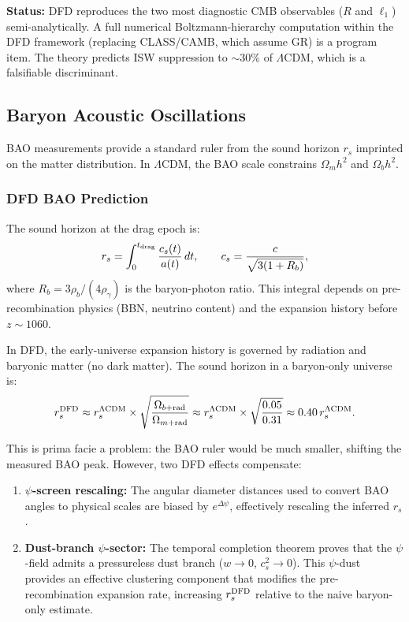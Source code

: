 \documentclass[aps,prd,twocolumn,superscriptaddress,nofootinbib]{revtex4-2}
\begin{document}
\textbf{Status:} DFD reproduces the two most diagnostic CMB observables
($R$ and $\ell_1$) semi-analytically. A full numerical Boltzmann-hierarchy
computation within the DFD framework (replacing CLASS/CAMB, which
assume GR) is a program item. The theory predicts ISW suppression to
$\sim$30\% of $\Lambda$CDM, which is a falsifiable discriminant.

\subsection{Baryon Acoustic Oscillations}\label{sec:bao}

BAO measurements provide a standard ruler from the sound horizon
$r_s$ imprinted on the matter distribution. In $\Lambda$CDM, the
BAO scale constrains $\Omega_m h^2$ and $\Omega_b h^2$.

\subsubsection{DFD BAO Prediction}

The sound horizon at the drag epoch is:
\begin{equation}
r_s = \int_0^{t_{\rm drag}} \frac{c_s(t)}{a(t)}\,dt,
\qquad c_s = \frac{c}{\sqrt{3(1 + R_b)}},
\end{equation}
where $R_b = 3\rho_b/(4\rho_\gamma)$ is the baryon-photon ratio.
This integral depends on pre-recombination physics (BBN, neutrino
content) and the expansion history before $z \sim 1060$.

In DFD, the early-universe expansion history is governed by
radiation and baryonic matter (no dark matter). The sound
horizon in a baryon-only universe is:
\begin{equation}
r_s^{\rm DFD} \approx r_s^{\Lambda\rm CDM}\times
\sqrt{\frac{\Omega_{b+\rm rad}}{\Omega_{m+\rm rad}}}
\approx r_s^{\Lambda\rm CDM}\times\sqrt{\frac{0.05}{0.31}}
\approx 0.40\,r_s^{\Lambda\rm CDM}.
\end{equation}

This is prima facie a problem: the BAO ruler would be much smaller,
shifting the measured BAO peak. However, two DFD effects compensate:

\begin{enumerate}
\item \textbf{$\psi$-screen rescaling:} The angular diameter
  distances used to convert BAO angles to physical scales are
  biased by $e^{\Delta\psi}$, effectively rescaling the inferred
  $r_s$.

\item \textbf{Dust-branch $\psi$-sector:} The temporal completion
  theorem proves that the $\psi$-field admits a pressureless dust
  branch ($w \to 0$, $c_s^2 \to 0$). This $\psi$-dust provides
  an effective clustering component that modifies the pre-recombination
  expansion rate, increasing $r_s^{\rm DFD}$ relative to the
  naive baryon-only estimate.
\end{enumerate}
\end{document}
